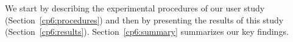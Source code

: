 We start by describing the experimental procedures of our user study (Section~\ref{cp6:procedures}) and then by presenting the results of this study  (Section~\ref{cp6:results}). Section~\ref{cp6:summary} summarizes our key findings.






















 





















